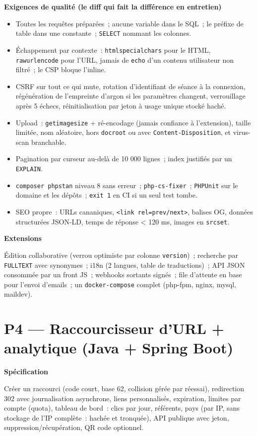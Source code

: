 \documentclass[12pt,a4paper,twoside,openright]{book}
\newcommand{\etape}[1]{\par\medskip\noindent\textbf{\large #1}\par\smallskip}
\begin{document}
\etape{Exigences de qualit\'e (le diff qui fait la diff\'erence en entretien)}
\begin{itemize}
  \item Toutes les requ\^etes pr\'epar\'ees~; aucune variable dans le SQL~; le pr\'efixe de table dans une
        constante~; \verb|SELECT| nommant les colonnes.
  \item \'Echappement par contexte~: \verb|htmlspecialchars| pour le HTML, \verb|rawurlencode| pour
        l'URL, jamais de \verb|echo| d'un contenu utilisateur non filtr\'e~; le CSP bloque l'inline.
  \item CSRF sur tout ce qui mute, rotation d'identifiant de s\'eance \`a la connexion, r\'eg\'en\'eration
        de l'empreinte d'argon si les param\`etres changent, verrouillage apr\`es 5 \'echecs,
        r\'einitialisation par jeton \`a usage unique stock\'e hach\'e.
  \item Upload~: \verb|getimagesize| + r\'e-encodage (jamais confiance \`a l'extension), taille limit\'ee,
        nom al\'eatoire, hors \verb|docroot| ou avec \verb|Content-Disposition|, et virus-scan branchable.
  \item Pagination par curseur au-del\`a de 10 000 lignes~; index justifi\'es par un \verb|EXPLAIN|.
  \item \verb|composer phpstan| niveau 8 sans erreur~; \verb|php-cs-fixer|~; \verb|PHPUnit| sur le
        domaine et les d\'ep\^ots~; \verb|exit 1| en CI si un seul test tombe.
  \item SEO propre~: URLs cananiques, \verb|<link rel=prev/next>|, balises OG, donn\'ees structur\'ees
        JSON-LD, temps de r\'eponse < 120 ms, images en \verb|srcset|.
\end{itemize}

\etape{Extensions}
\'Edition collaborative (verrou optimiste par colonne \verb|version|)~; recherche par \verb|FULLTEXT|
avec synonymes~; i18n (2 langues, table de traductions)~; API JSON consomm\'ee par un front JS~;
webhooks sortants sign\'es~; file d'attente en base pour l'envoi d'emails~; un
\verb|docker-compose| complet (php-fpm, nginx, mysql, maildev).

\section{P4 --- Raccourcisseur d'URL + analytique (Java + Spring Boot)}

\etape{Sp\'ecification}
Cr\'eer un raccourci (code court, base 62, collision g\'er\'ee par r\'eessai), redirection 302 avec
journalisation asynchrone, liens personnalis\'es, expiration, limites par compte (quota),
tableau de bord~: clics par jour, r\'ef\'erents, pays (par IP, sans stockage de l'IP compl\`ete~: hach\'ee
et tronqu\'ee), API publique avec jeton, suppression/r\'ecup\'eration, QR code optionnel.
\end{document}
